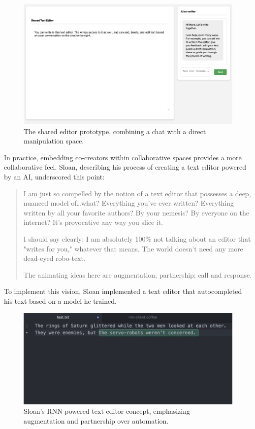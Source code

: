 \begin{figure}[H]
    \centering
    \includegraphics[width=1\linewidth]{sharededitor.png}
    \caption{The shared editor prototype, combining a chat with a direct manipulation space.}
    \label{fig:shared-editor}
\end{figure}

In practice, embedding co-creators within collaborative spaces provides a more collaborative feel. Sloan, describing his process of creating a text editor powered by an AI, underscored this point:

\begin{quote}
I am just so compelled by the notion of a text editor that possesses a deep, nuanced model of…what? Everything you've ever written? Everything written by all your favorite authors? By your nemesis? By everyone on the internet? It's provocative any way you slice it.

I should say clearly: I am absolutely 100\% not talking about an editor that "writes for you," whatever that means. The world doesn't need any more dead-eyed robo-text.

The animating ideas here are augmentation; partnership; call and response.
\end{quote}

To implement this vision, Sloan implemented a text editor that autocompleted his text based on a model he trained.

\begin{figure}
    \centering
    \includegraphics[width=1\linewidth]{rnn.png}
    \caption{Sloan's RNN-powered text editor concept, emphasizing augmentation and partnership over automation.}
    \label{fig:enter-label}
\end{figure}

